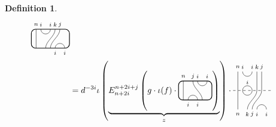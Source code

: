 \documentclass[11pt]{article}
\theoremstyle{plain}
\theoremstyle{definition}
\newtheorem{defn}[thm]{Definition}
\begin{document}
\begin{defn}
\begin{align*}
\begin{tikzpicture}[baseline=.3cm]
   \draw (.2,0) -- (.2,.8);
   \node at (.2,1) {\scriptsize{$n$}};
   \draw (.4,.8) arc (-180:0:.2cm);
   \node at (.4,1) {\scriptsize{$i$}};
   \node at (.8,1) {\scriptsize{$i$}};
   \draw (.6,0) .. controls ++(90:.3cm) and ++(270:.3cm) .. (1,.8);
   \node at (1,1) {\scriptsize{$k$}};
   \draw (.8,0) .. controls ++(90:.3cm) and ++(270:.3cm) .. (1.2,.8);
   \node at (1.2,1) {\scriptsize{$j$}};
   \draw (1,0) arc (180:0:.2cm);
   \node at (1,-.2) {\scriptsize{$i$}};
   \node at (1.4,-.2) {\scriptsize{$i$}};
   \draw[thick, rounded corners=5pt] (0,0) rectangle (1.6,.8);
  \end{tikzpicture}
  \\&= 
  d^{-3i}
  \iota\left(
  \underbrace{E^{n+2i+j}_{n+2i}\left(g\cdot\iota(f)\cdot %
  \begin{tikzpicture}[baseline=.3cm]
   \draw (.2,0) -- (.2,.8);
   \node at (.2,1) {\scriptsize{$n$}};
   \draw (.6,.8) .. controls ++(-90:.3cm) and ++ (-270:.3cm) .. (1,0);
   \node at (.6,1) {\scriptsize{$j$}};
   \draw (.8,.8) arc (-180:0:.2cm);
   \node at (.8,1) {\scriptsize{$i$}};
   \node at (1.2,1) {\scriptsize{$i$}};
   \draw (.4,0) arc (180:0:.2cm);
   \node at (.4,-.2) {\scriptsize{$i$}};
   \node at (.8,-.2) {\scriptsize{$i$}};
   \draw[thick, rounded corners=5pt] (0,0) rectangle (1.4,.8);
  \end{tikzpicture}
  \right)}_{z}
  \right)\cdot
  \begin{tikzpicture}[baseline=.3cm]
   \begin{scope}[shift={(0,.4)}]
    \draw (.2,0) -- (.2,.8);
    \node at (.2,1) {\scriptsize{$n$}};
    \draw (.4,0) arc (180:0:.2cm); %
    \draw (.4,.8) arc (-180:0:.2cm);
    \node at (.4,1) {\scriptsize{$i$}};
    \node at (.8,1) {\scriptsize{$i$}};
    \draw (1,0) -- (1,.8);
    \node at (1,1) {\scriptsize{$k$}};
    \draw (1.2,0) -- (1.2,.8);
    \node at (1.2,1) {\scriptsize{$j$}};
    \node at (.6,.35) {\scriptsize{$i$}};
    \draw[dashed] (0,0) -- (1.6,0);
   \end{scope}
   \begin{scope}[shift={(0,-.4)}]
    \draw (.2,0) -- (.2,.8);
    \node at (.2,-.2) {\scriptsize{$n$}};
    \draw (.4,.8) arc (-180:0:.2cm); %
    \draw (.6,0) .. controls ++(90:.3cm) and ++(270:.3cm) .. (1,.8);
    \node at (.6,-.2) {\scriptsize{$k$}};
    \draw (.8,0) .. controls ++(90:.3cm) and ++(270:.3cm) .. (1.2,.8);
    \node at (.8,-.2) {\scriptsize{$j$}};
    \draw (1,0) arc (180:0:.2cm);
    \node at (1,-.2) {\scriptsize{$i$}};
    \node at (1.4,-.2) {\scriptsize{$i$}};

\end{scope}
\end{tikzpicture}
\end{align*}
\end{defn}
\end{document}
